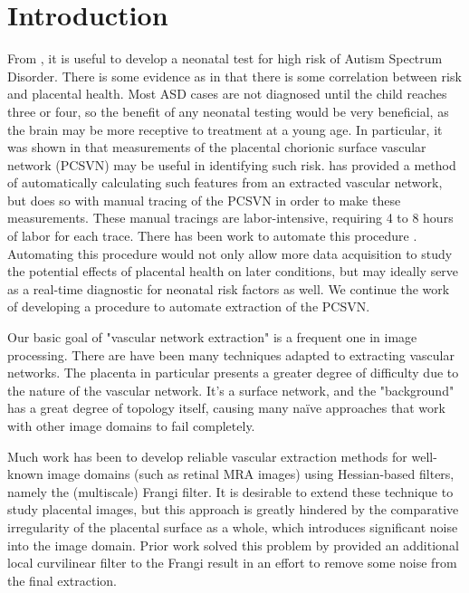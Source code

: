 
\chapter{Introduction} \label{ch:introduction}

From \cite{chang2017}, it is useful to develop a neonatal test for high risk of
Autism Spectrum Disorder. There is some evidence as in \cite{chang2016whole}
that there is some correlation between risk and placental health. Most ASD
cases are not diagnosed until the child reaches three or four, so the benefit
of any neonatal testing would be very beneficial, as the brain may be more
receptive to treatment at a young age. In particular, it was shown in
\cite{chang2016whole} that measurements of the placental chorionic surface
vascular network (PCSVN) may be useful in identifying such risk.
\cite{chang2017} has provided a method of automatically calculating such
features from an extracted vascular network, but does so with manual tracing of
the PCSVN in order to make these measurements.  These manual tracings are
labor-intensive, requiring 4 to 8 hours of labor for each trace. There has been
work to automate this procedure \cite{almoussa-ucla-reu} \cite{huynh2013filter}
\cite{djima2017enhancing}. Automating this procedure would not only allow more
data acquisition to study the potential effects of placental health on later
conditions, but may ideally serve as a real-time diagnostic for neonatal risk
factors as well. We continue the work of developing a procedure to automate
extraction of the PCSVN.


Our basic goal of "vascular network extraction" is a frequent one in image
processing. There are have been many techniques adapted to extracting vascular
networks. The placenta in particular presents a greater degree of difficulty
due to the nature of the vascular network. It's a surface network, and the
"background" has a great degree of topology itself, causing many na\"{i}ve
approaches that work with other image domains to fail completely.


Much work has been to develop reliable vascular extraction methods for
well-known image domains (such as retinal MRA images) using Hessian-based
filters, namely the (multiscale) Frangi filter. It is desirable to extend these
technique to study placental images, but this approach is greatly hindered by
the comparative irregularity of the placental surface as a whole, which
introduces significant noise into the image domain.  Prior work
\cite{huynh2013filter} solved this problem by provided an additional local
curvilinear filter to the Frangi result in an effort to remove some noise from
the final extraction.

